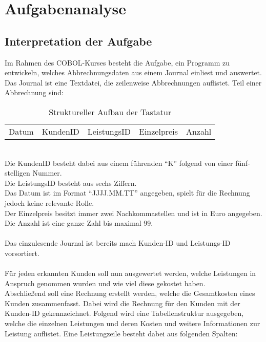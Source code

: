\chapter{Aufgabenanalyse}\label{ch:aufgabenanalyse}


\section{Interpretation der Aufgabe}\label{sec:interpretation-der-aufgabe}
Im Rahmen des COBOL-Kurses besteht die Aufgabe, ein Programm zu entwickeln, welches Abbrechnungsdaten aus einem Journal einliest und auswertet.\\
\noindent
Das Journal ist eine Textdatei, die zeilenweise Abbrechnungen auflistet. Teil einer Abbrechnung sind: 

\begin{table}[h]
    \centering
    \begin{tabular}{|l|l|l|l|l|}
        Datum & KundenID & LeistungsID & Einzelpreis & Anzahl
    \end{tabular}
    \caption{Struktureller Aufbau der Tastatur}
\end{table}

\noindent
\\
Die KundenID besteht dabei aus einem führenden \enquote{K} folgend von einer fünf-stelligen Nummer.\\
Die LeistungsID besteht aus sechs Ziffern.\\
Das Datum ist im Format \enquote{JJJJ.MM.TT} angegeben, spielt für die Rechnung jedoch keine relevante Rolle.\\
Der Einzelpreis besitzt immer zwei Nachkommastellen und ist in Euro angegeben.\\
Die Anzahl ist eine ganze Zahl bis maximal 99.\\
\\
Das einzulesende Journal ist bereits mach Kunden-ID und Leistungs-ID vorsortiert.
\\
\\
Für jeden erkannten Kunden soll nun ausgewertet werden, welche Leistungen in Anspruch genommen wurden und wie viel diese gekostet haben.
\\
Abschließend soll eine Rechnung erstellt werden, welche die Gesamtkosten eines Kunden zusammenfasst. Dabei wird die Rechnung für den Kunden mit der Kunden-ID gekennzeichnet. Folgend wird eine Tabellenstruktur ausgegeben, welche die einzelnen Leistungen und deren Kosten und weitere Informationen zur Leistung auflistet. Eine Leistungzeile besteht dabei aus folgenden Spalten:\\

